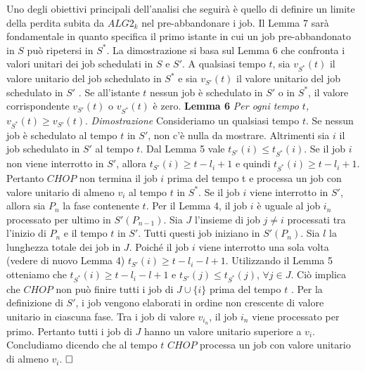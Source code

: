 \documentclass[12pt]{article}
\begin{document}
Uno degli obiettivi principali dell'analisi che seguirà è quello di definire un limite della perdita subita da $ALG2_{k}$ nel pre-abbandonare i job. Il Lemma 7 sarà fondamentale in quanto specifica il primo istante in cui un job pre-abbandonato in $S$ può ripetersi in $S^{*}$. La dimostrazione si basa sul Lemma 6 che confronta i valori unitari dei job schedulati in $S$ e $S'$. A qualsiasi tempo $t$, sia $v_{S^{*}}(t)$ il valore unitario del job schedulato in $S^{*}$ e sia $v_{S'}(t)$ il valore unitario del job schedulato in $S'$ . Se all'istante $t$ nessun job è schedulato in $S'$ o in $S^{*}$, il valore corrispondente $v_{S'}(t)$ o $v_{S^{*}}(t)$ è zero.
\newline \newline
\textbf{Lemma 6}
\textit{Per ogni tempo $t$, $v_{S^{*}}(t) \geq v_{S'}(t).$}
\newline \newline
\textit{Dimostrazione}
Consideriamo un qualsiasi tempo $t$. Se nessun job è schedulato al tempo $t$ in $S'$, non c'è nulla da mostrare. Altrimenti sia $i$ il job schedulato in $S'$ al tempo $t$. Dal Lemma 5 vale $t_{S'}(i) \leq t_{S^{*}}(i)$. Se il job $i$ non viene interrotto in $S'$, allora $t_{S'}(i) \geq t - l_{i} + 1$ e quindi $t_{S^{*}}(i) \geq t - l_{i} +1$. Pertanto $CHOP$ non termina il job $i$ prima del tempo t e processa un job con valore unitario di almeno $v_{i}$ al tempo $t$ in $S^{*}$. Se il job $i$ viene interrotto in $S'$, allora sia $P_{n}$ la fase contenente $t$. Per il Lemma 4, il job $i$ è uguale al job $i_{n}$ processato per ultimo in $S'(P_{n - 1})$. Sia $J$ l'insieme di job $j \ne i$ processati tra l'inizio di $P_{n}$ e il tempo $t$ in $S'$. Tutti questi job iniziano in $S'(P_{n})$. Sia $l$ la lunghezza totale dei job in $J$. Poiché il job $i$ viene interrotto una sola volta (vedere di nuovo Lemma 4) $t_{S'}(i) \geq t - l_{i} - l + 1$. Utilizzando il Lemma 5 otteniamo che $t_{S^{*}}(i) \geq t - l_{i} - l + 1$ e $t_{S'}(j) \leq t_{S^{*}}(j)$, $\forall j \in J$. Ciò implica che $CHOP$ non può finire tutti i job di $J \cup \{i\}$ prima del tempo $t$ . Per la definizione di $S'$, i job vengono elaborati in ordine non crescente di valore unitario in ciascuna fase. Tra i job di valore $v_{i_{n}}$, il job $i_{n}$ viene processato per primo. Pertanto tutti i job di $J$ hanno un valore unitario superiore a $v_{i}$. Concludiamo dicendo che al tempo $t$ $CHOP$ processa un job con valore unitario di almeno $v_{i}$. $\hfill \square$
\newline \newline
\end{document}
